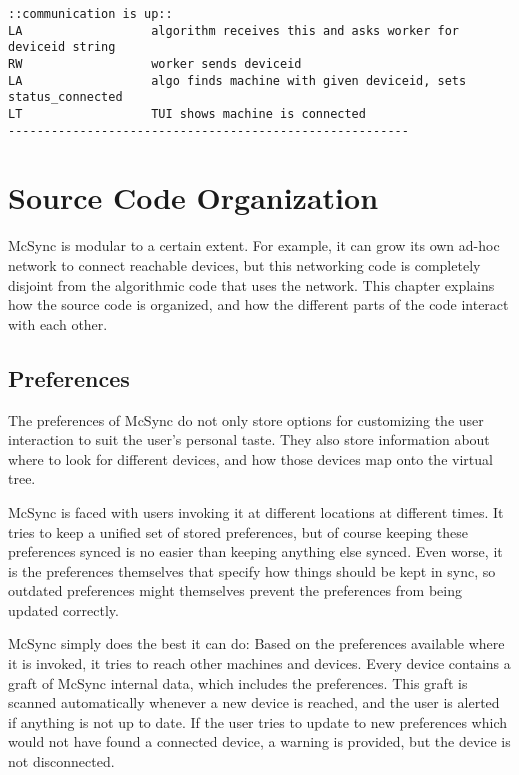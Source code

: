 \documentclass{book}
\begin{document}
\begin{verbatim}
::communication is up::
LA                  algorithm receives this and asks worker for deviceid string
RW                  worker sends deviceid
LA                  algo finds machine with given deviceid, sets status_connected
LT                  TUI shows machine is connected
--------------------------------------------------------
\end{verbatim}






\chapter{Source Code Organization}\label{chap:code}

McSync is modular to a certain extent.
For example, it can grow its own ad-hoc network to connect reachable devices,
but this networking code is completely disjoint from the algorithmic code that uses the network.
%
This chapter explains how the source code is organized,
and how the different parts of the code interact with each other.

\section{Preferences}

The preferences of McSync do not only store options for customizing the user interaction to suit
the user's personal taste.
They also store information about where to look for different devices,
and how those devices map onto the virtual tree.

McSync is faced with users invoking it at different locations at different times.
It tries to keep a unified set of stored preferences,
but of course keeping these preferences synced is no easier than keeping anything else synced.
Even worse, it is the preferences themselves that specify how things should be kept in sync,
so outdated preferences might themselves prevent the preferences from being updated correctly.

McSync simply does the best it can do:
Based on the preferences available where it is invoked,
it tries to reach other machines and devices.
Every device contains a graft of McSync internal data,
which includes the preferences.
This graft is scanned automatically whenever a new device is reached,
and the user is alerted if anything is not up to date.
If the user tries to update to new preferences which would not have found a connected device,
a warning is provided, but the device is not disconnected.
\end{document}
